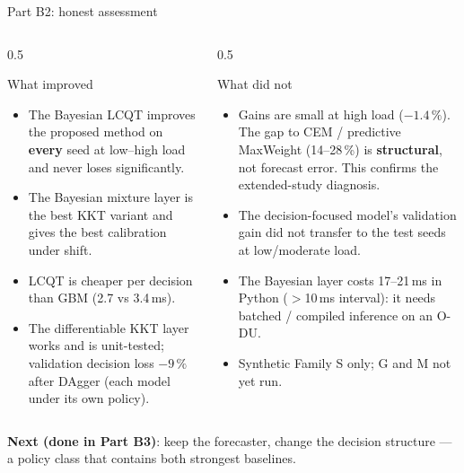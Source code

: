 \documentclass[aspectratio=169,11pt,xcolor=table]{beamer}
\begin{document}
\begin{frame}{Part B2: honest assessment}
  \small
  \begin{columns}[T]
    \begin{column}{0.5\textwidth}
      \begin{exampleblock}{What improved}
        \begin{itemize}\footnotesize
          \item The Bayesian LCQT improves the proposed method on \textbf{every} seed at low--high load and never loses significantly.
          \item The Bayesian mixture layer is the best KKT variant and gives the best calibration under shift.
          \item LCQT is cheaper per decision than GBM (2.7 vs 3.4\,ms).
          \item The differentiable KKT layer works and is unit-tested; validation decision loss $-9\,\%$ after DAgger (each model under its own policy).
        \end{itemize}
      \end{exampleblock}
    \end{column}
    \begin{column}{0.5\textwidth}
      \begin{alertblock}{What did not}
        \begin{itemize}\footnotesize
          \item Gains are small at high load ($-1.4\,\%$). The gap to CEM / predictive MaxWeight (14--28\,\%) is \textbf{structural}, not forecast error. This confirms the extended-study diagnosis.
          \item The decision-focused model's validation gain did not transfer to the test seeds at low/moderate load.
          \item The Bayesian layer costs 17--21\,ms in Python ($>$10\,ms interval): it needs batched / compiled inference on an O-DU.
          \item Synthetic Family S only; G and M not yet run.
        \end{itemize}
      \end{alertblock}
    \end{column}
  \end{columns}
  \vspace{2pt}
  \footnotesize\textbf{Next (done in Part B3)}: keep the forecaster, change the decision structure --- a policy class that contains both strongest baselines.
\end{frame}
\end{document}
